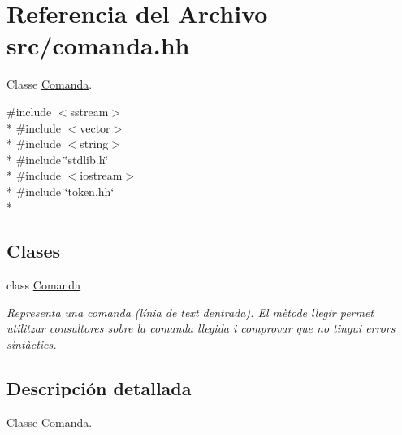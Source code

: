 \hypertarget{comanda_8hh}{}\section{Referencia del Archivo src/comanda.hh}
\label{comanda_8hh}


Classe \hyperlink{class_comanda}{Comanda}.  


{\ttfamily \#include $<$sstream$>$}\\*
{\ttfamily \#include $<$vector$>$}\\*
{\ttfamily \#include $<$string$>$}\\*
{\ttfamily \#include \char`\"{}stdlib.\+h\char`\"{}}\\*
{\ttfamily \#include $<$iostream$>$}\\*
{\ttfamily \#include \char`\"{}token.\+hh\char`\"{}}\\*
\subsection*{Clases}
\begin{DoxyCompactItemize}
\item 
class \hyperlink{class_comanda}{Comanda}
\begin{DoxyCompactList}\small\item\em Representa una comanda (línia de text d\textquotesingle{}entrada). El mètode llegir permet utilitzar consultores sobre la comanda llegida i comprovar que no tingui errors sintàctics. \end{DoxyCompactList}\end{DoxyCompactItemize}


\subsection{Descripción detallada}
Classe \hyperlink{class_comanda}{Comanda}. 

